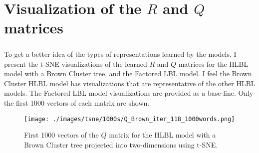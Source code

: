 
\chapter{Visualization of the $R$ and $Q$ matrices}
\paragraph{}
To get a better idea of the types of representations learned by the models, I present the t-SNE visualizations of the learned $R$ and $Q$ matrices for the HLBL model with a Brown Cluster tree, and the Factored LBL model. I feel the Brown Cluster HLBL model has visualizations that are representative of the other HLBL models. The Factored LBL model visualizations are provided as a base-line. Only the first 1000 vectors of each matrix are shown.



\begin{figure}[ht]
\texttt{[image: ./images/tsne/1000s/Q\_Brown\_iter\_118\_1000words.png]} 
\centering
\caption{First 1000 vectors of the $Q$ matrix for the HLBL model with a Brown Cluster tree projected into two-dimensions using t-SNE.}
\end{figure}
%
%
%
%

